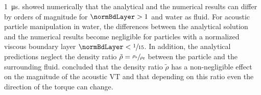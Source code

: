 \SI{1}{\micro\second}. \citeauthor{hahn2016} \cite{hahn2016} showed numerically 
that the analytical and the numerical results can differ by orders of magnitude 
for $\normBdLayer > 1$ and water as fluid. For acoustic particle manipulation in 
water, the differences between the analytical solution and the numerical results 
become negligible for particles with a normalized viscous boundary layer 
$\normBdLayer < \sfrac{1}{15}$. In addition, the analytical predictions neglect 
the density ratio $\tilde{\rho} = \sfrac{\rho_{\text{s}}}{\rho_{\text{f}}}$ 
between the particle and the surrounding fluid.  \citeauthor{hahn2016} 
\cite{hahn2016} concluded that the density ratio $\tilde{\rho}$ has a 
non-negligible effect on the magnitude of the acoustic VT and that depending on 
this ratio even the direction of the torque can change.
